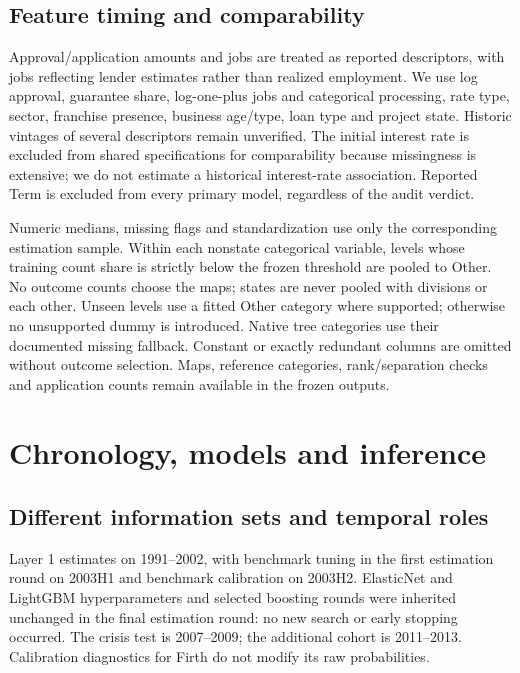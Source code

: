 \subsection{Feature timing and comparability}
Approval/application amounts and jobs are treated as reported descriptors, with jobs reflecting lender estimates rather than realized employment. We use log approval, guarantee share, log-one-plus jobs and categorical processing, rate type, sector, franchise presence, business age/type, loan type and project state. Historic vintages of several descriptors remain unverified. The initial interest rate is excluded from shared specifications for comparability because missingness is extensive; we do not estimate a historical interest-rate association. Reported Term is excluded from every primary model, regardless of the audit verdict.


Numeric medians, missing flags and standardization use only the corresponding estimation sample. Within each nonstate categorical variable, levels whose training count share is strictly below the frozen threshold are pooled to Other. No outcome counts choose the maps; states are never pooled with divisions or each other. Unseen levels use a fitted Other category where supported; otherwise no unsupported dummy is introduced. Native tree categories use their documented missing fallback. Constant or exactly redundant columns are omitted without outcome selection. Maps, reference categories, rank/separation checks and application counts remain available in the frozen outputs.

\section{Chronology, models and inference}
\subsection{Different information sets and temporal roles}
Layer 1 estimates on 1991--2002, with benchmark tuning in the first estimation round on 2003H1 and benchmark calibration on 2003H2. ElasticNet and LightGBM hyperparameters and selected boosting rounds were inherited unchanged in the final estimation round: no new search or early stopping occurred. The crisis test is 2007--2009; the additional cohort is 2011--2013. Calibration diagnostics for Firth do not modify its raw probabilities.


